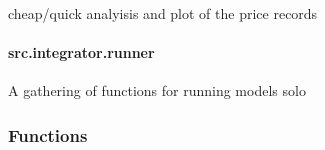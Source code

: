 \documentclass[letterpaper,10pt,english]{sphinxmanual}
\begin{document}

\begin{fulllineitems}
\label{\detokenize{src.integrator.progress_plot:src.integrator.progress_plot.plot_price_distro}}
\pysigstartsignatures
\pysiglinewithargsret
{}
{\sphinxparamcomma {}}
{}
\pysigstopsignatures
\sphinxAtStartPar
cheap/quick analyisis and plot of the price records

\end{fulllineitems}


\sphinxstepscope


\paragraph{src.integrator.runner}
\label{\detokenize{src.integrator.runner:module-src.integrator.runner}}\label{\detokenize{src.integrator.runner:src-integrator-runner}}\label{\detokenize{src.integrator.runner::doc}}
\sphinxAtStartPar
A gathering of functions for running models solo
\subsubsection*{Functions}
\end{document}
